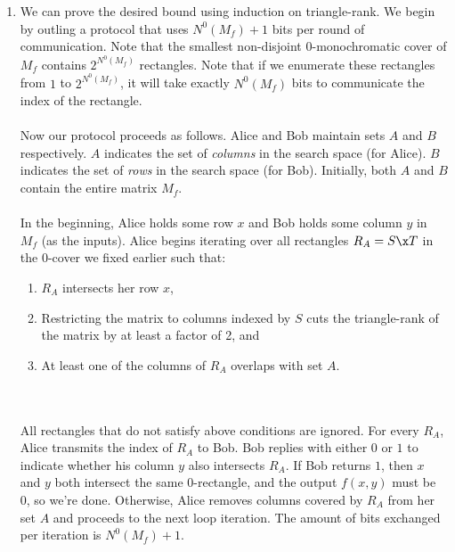 \documentclass{article}
\begin{document}
\begin{enumerate}
\begin{enumerate}
        \item We can prove the desired bound using induction on triangle-rank.
            We begin by outling a protocol that uses $N^0(M_f) + 1$ bits per
            round of communication. Note that the smallest non-disjoint
            0-monochromatic cover of $M_f$ contains $2^{N^0(M_f)}$ rectangles.
            Note that if we enumerate these rectangles from $1$ to
            $2^{N^0(M_f)}$, it will take exactly $N^0(M_f)$ bits to communicate
            the index of the rectangle.
            \\\\
            Now our protocol proceeds as follows. Alice and Bob maintain sets
            $A$ and $B$ respectively. $A$ indicates the set of \textit{columns}
            in the search space (for Alice). $B$ indicates the set of
            \textit{rows} in the search space (for Bob). Initially, both $A$
            and $B$ contain the entire matrix $M_f$.
            \\\\
            In the beginning, Alice holds some row $x$ and Bob holds some
            column $y$ in $M_f$ (as the inputs).  Alice begins iterating over
            all rectangles $R_A = S \x T$ in the 0-cover we fixed earlier such
            that:
            \begin{enumerate}
                \item $R_A$ intersects her row $x$,
                \item Restricting the matrix to columns indexed by $S$ cuts the
                    triangle-rank of the matrix by at least a factor of 2, and
                \item At least one of the columns of $R_A$ overlaps with set
                    $A$.
            \end{enumerate}
            \\\\
            All rectangles that do not satisfy above conditions are ignored.
            For every $R_A$, Alice transmits the index of $R_A$ to Bob. Bob
            replies with either $0$ or $1$ to indicate whether his column $y$
            also intersects $R_A$. If Bob returns $1$, then $x$ and $y$ both
            intersect the same 0-rectangle, and the output $f(x, y)$ must be 0,
            so we're done. Otherwise, Alice removes columns covered by $R_A$
            from her set $A$ and proceeds to the next loop iteration. The
            amount of bits exchanged per iteration is $N^0(M_f) + 1$.

\end{enumerate}
\end{enumerate}
\end{document}
